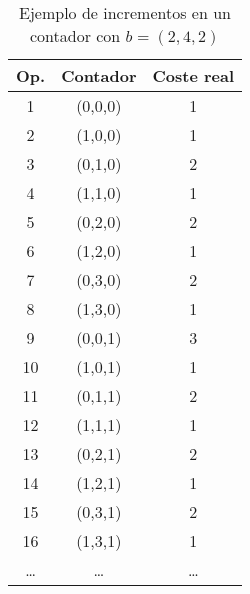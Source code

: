 \documentclass[aspectratio=169]{beamer}
\begin{document}
\begin{frame}{}
    \begin{table}
        \centering
        {\small
            \begin{tabular}{|c|c|c|}
                \hline
                \textbf{Op.} & \textbf{Contador} & \textbf{Coste real} \\
                \hline
                1            & (0,0,0)           & 1                   \\
                2            & (1,0,0)           & 1                   \\
                3            & (0,1,0)           & 2                   \\
                4            & (1,1,0)           & 1                   \\
                5            & (0,2,0)           & 2                   \\
                6            & (1,2,0)           & 1                   \\
                7            & (0,3,0)           & 2                   \\
                8            & (1,3,0)           & 1                   \\
                9            & (0,0,1)           & 3                   \\
                10           & (1,0,1)           & 1                   \\
                11           & (0,1,1)           & 2                   \\
                12           & (1,1,1)           & 1                   \\
                13           & (0,2,1)           & 2                   \\
                14           & (1,2,1)           & 1                   \\
                15           & (0,3,1)           & 2                   \\
                16           & (1,3,1)           & 1                   \\
                \ldots       & \ldots            & \ldots              \\
                \hline
            \end{tabular}
        }
        \caption{Ejemplo de incrementos en un contador con $b = (2,4,2)$}
    \end{table}
\end{frame}
\end{document}
